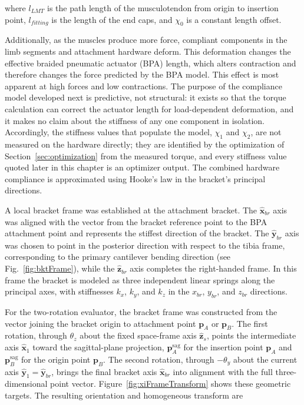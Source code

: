 where $l_{LMT}$ is the path length of the musculotendon from origin to insertion point, $l_{fitting}$ is the length of the end caps, and $\chi_{0}$ is a constant length offset. 

Additionally, as the muscles produce more force, compliant components in the limb segments and attachment hardware deform. This deformation changes the effective braided pneumatic actuator (BPA) length, which alters contraction and therefore changes the force predicted by the BPA model. This effect is most apparent at high forces and low contractions. The purpose of the compliance model developed next is predictive, not structural: it exists so that the torque calculation can correct the actuator length for load-dependent deformation, and it makes no claim about the stiffness of any one component in isolation. Accordingly, the stiffness values that populate the model, $\chi_{1}$ and $\chi_{2}$, are not measured on the hardware directly; they are identified by the optimization of Section~\ref{sec:optimization} from the measured torque, and every stiffness value quoted later in this chapter is an optimizer output. The combined hardware compliance is approximated using Hooke's law in the bracket's principal directions.

A local bracket frame was established at the attachment bracket. The $\hat{\mathbf{x}}_{br}$ axis was aligned with the vector from the bracket reference point to the BPA attachment point and represents the stiffest direction of the bracket. The $\hat{\mathbf{y}}_{br}$ axis was chosen to point in the posterior direction with respect to the tibia frame, corresponding to the primary cantilever bending direction (see Fig.~\ref{fig:bktFrame}), while the $\hat{\mathbf{z}}_{br}$ axis completes the right-handed frame. In this frame the bracket is modeled as three independent linear springs along the principal axes, with stiffnesses $k_{x}$, $k_{y}$, and $k_{z}$ in the $x_{br}$, $y_{br}$, and $z_{br}$ directions.

For the two-rotation evaluator, the bracket frame was constructed from the vector joining the bracket origin to attachment point $\mathbf{p}_{A}$ or $\mathbf{p}_{B}$. The first rotation, through $\theta_z$ about the fixed space-frame axis $\hat{\mathbf{z}}_{s}$, points the intermediate axis $\hat{\mathbf{x}}_{1}$ toward the sagittal-plane projection, $\mathbf{p}_{A}^{\mathrm{sag}}$ for the insertion point $\mathbf{p}_{A}$ and $\mathbf{p}_{B}^{\mathrm{sag}}$ for the origin point $\mathbf{p}_{B}$. The second rotation, through $-\theta_y$ about the current axis $\hat{\mathbf{y}}_{1}=\hat{\mathbf{y}}_{br}$, brings the final bracket axis $\hat{\mathbf{x}}_{br}$ into alignment with the full three-dimensional point vector. Figure~\ref{fig:xiFrameTransform} shows these geometric targets. The resulting orientation and homogeneous transform are


